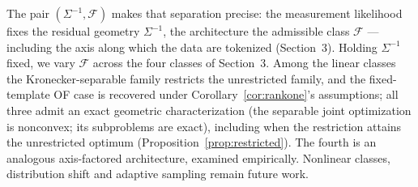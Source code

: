 The pair $(\Sigma^{-1},\mathcal{F})$ makes that separation precise: the measurement likelihood fixes the residual geometry $\Sigma^{-1}$, the architecture the admissible class $\mathcal{F}$ --- including the axis along which the data are tokenized (Section~3). Holding $\Sigma^{-1}$ fixed, we vary $\mathcal{F}$ across the four classes of Section~3. Among the linear classes the Kronecker-separable family restricts the unrestricted family, and the fixed-template OF case is recovered under Corollary~\ref{cor:rankone}'s assumptions; all three admit an exact geometric characterization (the separable joint optimization is nonconvex; its subproblems are exact), including when the restriction attains the unrestricted optimum (Proposition~\ref{prop:restricted}). The fourth is an analogous axis-factored architecture, examined empirically. Nonlinear classes, distribution shift and adaptive sampling remain future work.
